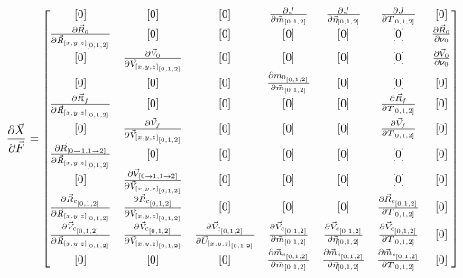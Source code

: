 \begin{equation}
\pdv{\vec{X}}{\vec{F}} = 
\begin{bmatrix}

[0] &
[0] &
[0] &
\pdv{J}{\vec{m}_{[0,1,2]}} &
\pdv{J}{\vec{\eta}_{[0,1,2]}} &
\pdv{J}{T_{[0,1,2]}} &
[0]  \\

\pdv{\vec{R}_0}{\vec{R}_{[x,y,z]_{[0,1,2]}}} &
[0] &
[0] &
[0] &
[0] &
[0] &
\pdv{\vec{R}_0}{\nu_0}  \\

[0] &
\pdv{\vec{V}_0}{\vec{V}_{[x,y,z]_{[0,1,2]}}} &
[0] &
[0] &
[0] &
[0] &
\pdv{\vec{V}_0}{\nu_0}  \\

[0] &
[0] &
[0] &
\pdv{m_{0_{[0,1,2]}}}{\vec{m}_{[0,1,2]}} &
[0] &
[0] &
[0]  \\

\pdv{\vec{R}_f}{\vec{R}_{[x,y,z]_{[0,1,2]}}} &
[0] &
[0] &
[0] &
[0] &
\pdv{\vec{R}_f}{T_{[0,1,2]}} &
[0]  \\

[0] &
\pdv{\vec{V}_f}{\vec{V}_{[x,y,z]_{[0,1,2]}}} &
[0] &
[0] &
[0] &
\pdv{\vec{V}_f}{T_{[0,1,2]}} &
[0]  \\

\pdv{\vec{R}_{[0 \rightarrow 1, 1 \rightarrow 2]}}{\vec{R}_{[x,y,z]_{[0,1,2]}}} &
[0] &
[0] &
[0] &
[0] &
[0] &
[0]  \\

[0] &
\pdv{\vec{V}_{[0 \rightarrow 1, 1 \rightarrow 2]}}{\vec{V}_{[x,y,z]_{[0,1,2]}}} &
[0] &
[0] &
[0] &
[0] &
[0]  \\

\pdv{\vec{R}_{c_{[0,1,2]}}}{\vec{R}_{[x,y,z]_{[0,1,2]}}} &
\pdv{\vec{R}_{c_{[0,1,2]}}}{\vec{V}_{[x,y,z]_{[0,1,2]}}} &
[0] &
[0] &
[0] &
\pdv{\vec{R}_{c_{[0,1,2]}}}{T_{[0,1,2]}} &
[0]  \\

\pdv{\vec{V}_{c_{[0,1,2]}}}{\vec{R}_{[x,y,z]_{[0,1,2]}}} &
\pdv{\vec{V}_{c_{[0,1,2]}}}{\vec{V}_{[x,y,z]_{[0,1,2]}}} &
\pdv{\vec{V}_{c_{[0,1,2]}}}{\vec{U}_{[x,y,z]_{[0,1,2]}}} &
\pdv{\vec{V}_{c_{[0,1,2]}}}{\vec{m}_{[0,1,2]}} &
\pdv{\vec{V}_{c_{[0,1,2]}}}{\vec{\eta}_{[0,1,2]}} &
\pdv{\vec{V}_{c_{[0,1,2]}}}{T_{[0,1,2]}} &
[0]  \\

[0] &
[0] &
[0] &
\pdv{\vec{m}_{c_{[0,1,2]}}}{\vec{m}_{[0,1,2]}} &
\pdv{\vec{m}_{c_{[0,1,2]}}}{\vec{\eta}_{[0,1,2]}} &
\pdv{\vec{m}_{c_{[0,1,2]}}}{T_{[0,1,2]}} &
[0]  \\


\end{bmatrix}
\end{equation}
